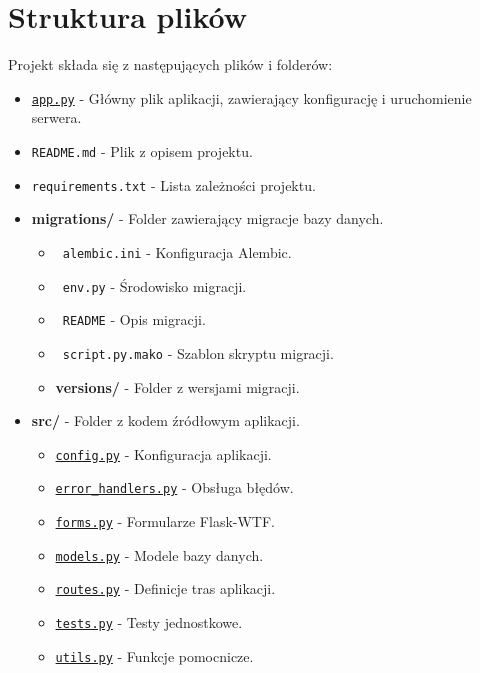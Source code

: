 \documentclass[12pt,a4paper]{report}
\begin{document}
\section{Struktura plików}
Projekt składa się z następujących plików i folderów:

\begin{itemize}
    \item \hyperref[sec:app]{\texttt{app.py}} - Główny plik aplikacji, zawierający konfigurację i uruchomienie serwera.
    \item \texttt{README.md} - Plik z opisem projektu.
    \item \texttt{requirements.txt} - Lista zależności projektu.

    \item \textbf{migrations/} - Folder zawierający migracje bazy danych.
    \begin{itemize}
        \item \texttt{ alembic.ini} - Konfiguracja Alembic.
        \item \texttt{ env.py} - Środowisko migracji.
        \item \texttt{ README} - Opis migracji.
        \item \texttt{ script.py.mako} - Szablon skryptu migracji.
        \item \textbf{ versions/} - Folder z wersjami migracji.
    \end{itemize}

    \item \textbf{src/} - Folder z kodem źródłowym aplikacji.
    \begin{itemize}
        \item \hyperref[sec:config]{ \texttt{config.py}} - Konfiguracja aplikacji.
        \item \hyperref[sec:error_handlers]{\texttt{error\_handlers.py}} - Obsługa błędów.
        \item \hyperref[sec:forms]{ \texttt{forms.py}} - Formularze Flask-WTF.
        \item \hyperref[sec:models]{ \texttt{models.py}} - Modele bazy danych.
        \item \hyperref[sec:routes]{ \texttt{routes.py}} - Definicje tras aplikacji.
        \item \hyperref[sec:tests]{ \texttt{tests.py}} - Testy jednostkowe.
        \item \hyperref[sec:utils]{ \texttt{utils.py}} - Funkcje pomocnicze.
    \end{itemize}


\end{itemize}
\end{document}
